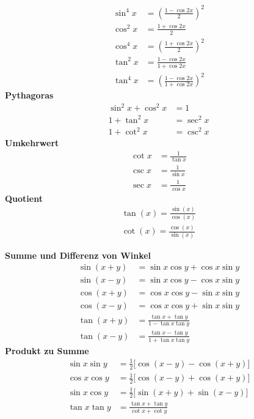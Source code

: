 \begin{multicols}{3}
\begin{multicols}{2}
\begin{align*}
  \sin^4x  & = (\frac{1 - \cos 2x}{2})^2           \\
  \cos^2 x & = \frac{1 + \cos 2x}{2}               \\
  \cos^4x  & = (\frac{1 + \cos 2x}{2})^2           \\
  \tan^2 x & = \frac{1 - \cos 2x}{1 + \cos 2x}     \\
  \tan^4 x & =( \frac{1 - \cos 2x}{1 + \cos 2x})^2
\end{align*}
\textbf{Pythagoras}
\begin{align*}
  \sin^2 x + \cos^2 x & = 1        \\
  1 + \tan^2 x        & = \sec^2 x \\
  1 + \cot^2 x        & = \csc^2 x
\end{align*}
\textbf{Umkehrwert}
\begin{align*}
  \cot x & = \frac{1}{\tan x} \\
  \csc x & = \frac{1}{\sin x} \\
  \sec x & = \frac{1}{\cos x}
\end{align*}
\textbf{Quotient}
\begin{align*}
    \tan(x) = \frac{\sin(x)}{\cos(x)}\\
    \cot(x) = \frac{\cos(x)}{\sin(x)}
\end{align*}
\end{multicols}
\textbf{Summe und Differenz von Winkel}
\begin{align*}
  \sin(x + y) & = \sin x \cos y + \cos x \sin y             \\
  \sin(x - y) & = \sin x \cos y - \cos x \sin y             \\
  \cos(x + y) & = \cos x \cos y - \sin x \sin y             \\
  \cos(x - y) & = \cos x \cos y + \sin x \sin y             \\
  \tan(x + y) & = \frac{\tan x + \tan y}{1 - \tan x \tan y} \\
  \tan(x - y) & = \frac{\tan x - \tan y}{1 + \tan x \tan y}
\end{align*}
\textbf{Produkt zu Summe}
\begin{align*}
  \sin x \sin y & = \frac{1}{2}\big[\cos(x - y) - \cos(x + y)\big] \\
  \cos x \cos y & = \frac{1}{2}\big[\cos(x - y) + \cos(x + y)\big] \\
  \sin x \cos y & = \frac{1}{2}\big[\sin(x + y) + \sin(x - y)\big] \\
  \tan x \tan y & = \frac{ \tan x + \tan y }{ \cot x + \cot y }    \\

\end{align*}
\end{multicols}
